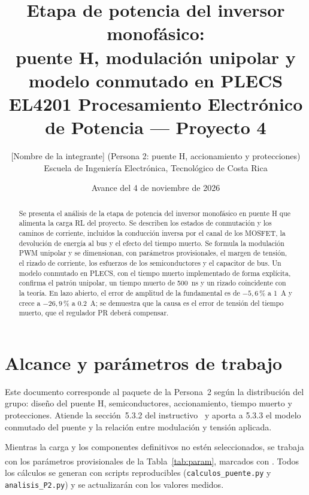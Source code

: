 \documentclass[10pt,twocolumn,letterpaper]{article}
\title{\textbf{Etapa de potencia del inversor monofásico:\\
puente H, modulación unipolar y modelo conmutado en PLECS}\\[4pt]
\large EL4201 Procesamiento Electrónico de Potencia --- Proyecto 4}
\author{[Nombre de la integrante] (Persona 2: puente H, accionamiento y protecciones)\\
Escuela de Ingeniería Electrónica, Tecnológico de Costa Rica}
\date{Avance del 4 de noviembre de 2026}
\newcommand{\prov}{\textsuperscript{\textdagger}}
\begin{document}
\maketitle

\begin{abstract}
Se presenta el análisis de la etapa de potencia del inversor monofásico en puente H que alimenta la carga RL del proyecto. Se describen los estados de conmutación y los caminos de corriente, incluidos la conducción inversa por el canal de los MOSFET, la devolución de energía al bus y el efecto del tiempo muerto. Se formula la modulación PWM unipolar y se dimensionan, con parámetros provisionales, el margen de tensión, el rizado de corriente, los esfuerzos de los semiconductores y el capacitor de bus. Un modelo conmutado en PLECS, con el tiempo muerto implementado de forma explícita, confirma el patrón unipolar, un tiempo muerto de \SI{500}{\nano\second} y un rizado coincidente con la teoría. En lazo abierto, el error de amplitud de la fundamental es de $-5{,}6\,\%$ a \SI{1}{\ampere} y crece a $-26{,}9\,\%$ a \SI{0,2}{\ampere}; se demuestra que la causa es el error de tensión del tiempo muerto, que el regulador PR deberá compensar.
\end{abstract}

\section{Alcance y parámetros de trabajo}
Este documento corresponde al paquete de la Persona~2 según la distribución del grupo: diseño del puente H, semiconductores, accionamiento, tiempo muerto y protecciones. Atiende la sección~5.3.2 del instructivo~\cite{instr} y aporta a 5.3.3 el modelo conmutado del puente y la relación entre modulación y tensión aplicada.

Mientras la carga y los componentes definitivos no estén seleccionados, se trabaja con los parámetros provisionales de la Tabla~\ref{tab:param}, marcados con \prov. Todos los cálculos se generan con scripts reproducibles (\texttt{calculos\_puente.py} y \texttt{analisis\_P2.py}) y se actualizarán con los valores medidos.
\end{document}
